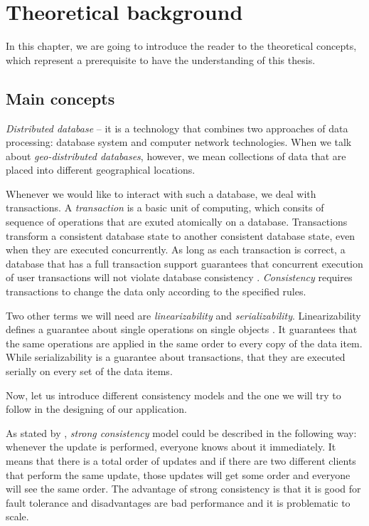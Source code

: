 \chapter{Theoretical background}
\label{Background}

In this chapter, we are going to introduce the reader to the theoretical concepts, which represent a prerequisite to have the understanding of this thesis.

\section{Main concepts}

\textit{Distributed database} -- it is a technology that combines two approaches of data processing: database system and computer network technologies\cite{11}. When we talk about \textit{geo-distributed databases}, however, we mean collections of data that are placed into different geographical locations.

Whenever we would like to interact with such a database, we deal with transactions. A \textit{transaction} is a basic unit of computing, which consits of sequence of operations that are exuted atomically on a database. Transactions transform a consistent database state to another consistent database state, even when they are executed concurrently. As long as each transaction is correct, a database that has a full transaction support guarantees that concurrent execution of user transactions will not violate database consistency \cite{11}. \textit{Consistency} requires transactions to change the data only according to the specified rules.

Two other terms we will need are \textit{linearizability} and \textit{serializability}. Linearizability defines a guarantee about single operations on single objects \cite{13}. It guarantees that the same operations are applied in the same order to every copy of the data item\cite{12}. While serializability is a guarantee about transactions, that they are executed serially on every set of the data items\cite{12}.

Now, let us introduce different consistency models and the one we will try to follow in the designing of our application. 

As stated by \citet{10}, \textit{strong consistency} model could be described in the following way: whenever the update is performed, everyone knows about it immediately. It means that there is a total order of updates and if there are two different clients that perform the same update, those updates will get some order and everyone will see the same order. The advantage of strong consistency is that it is good for fault tolerance and disadvantages are bad performance and it is problematic to scale.

